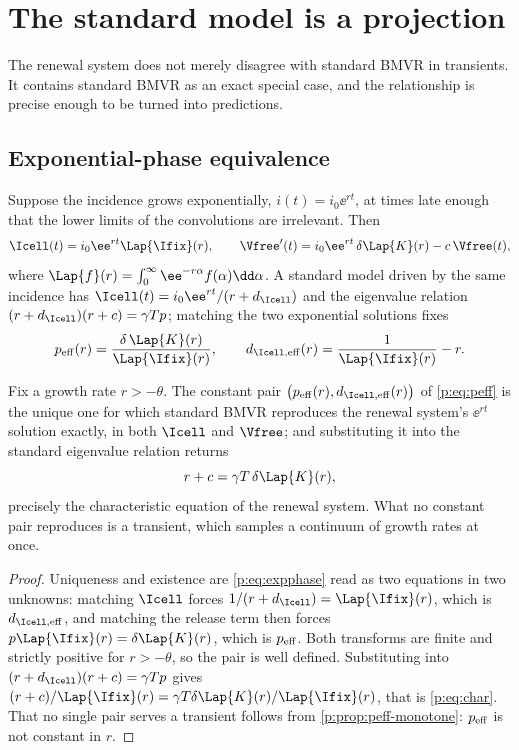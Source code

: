 \FloatBarrier

\section{The standard model is a projection}
\label{p:sec:projection}

The renewal system does not merely disagree with standard BMVR in
transients. It contains standard BMVR as an exact special case, and the
relationship is precise enough to be turned into predictions.

\subsection{Exponential-phase equivalence}

Suppose the incidence grows exponentially, $i(t)=i_0\ee^{rt}$, at times late
enough that the lower limits of the convolutions are irrelevant. Then
\begin{equation}
\Icell(t)=i_0\ee^{rt}\Lap{\Ifix}(r),
\qquad
\Vfree'(t)=i_0\ee^{rt}\,\delta\Lap{K}(r)-c\,\Vfree(t),
\label{p:eq:expphase}
\end{equation}
where $\Lap{f}(r)=\int_0^\infty\ee^{-r\alpha}f(\alpha)\dd\alpha$. A standard
model driven by the same incidence has $\Icell(t)=i_0\ee^{rt}/(r+d_{\Icell})$
and the eigenvalue relation $(r+d_{\Icell})(r+c)=\gamma Tp$; matching the two
exponential solutions fixes
\begin{equation}
p_{\rm eff}(r)=\frac{\delta\,\Lap{K}(r)}{\Lap{\Ifix}(r)},
\qquad
d_{\Icell,{\rm eff}}(r)=\frac{1}{\Lap{\Ifix}(r)}-r.
\label{p:eq:peff}
\end{equation}

\begin{theorem}
\label{p:thm:projection}
Fix a growth rate $r>-\theta$. The constant pair
$\bigl(p_{\rm eff}(r),d_{\Icell,{\rm eff}}(r)\bigr)$ of \cref{p:eq:peff} is
the unique one for which standard BMVR reproduces the renewal system's
$\ee^{rt}$ solution exactly, in both $\Icell$ and $\Vfree$; and substituting
it into the standard eigenvalue relation returns
\begin{equation}
r+c=\gamma T\,\delta\Lap{K}(r),
\label{p:eq:char}
\end{equation}
precisely the characteristic equation of the renewal system. What no
constant pair reproduces is a transient, which samples a continuum of growth
rates at once.
\end{theorem}

\begin{proof}
Uniqueness and existence are \cref{p:eq:expphase} read as two equations in
two unknowns: matching $\Icell$ forces $1/(r+d_{\Icell})=\Lap{\Ifix}(r)$,
which is $d_{\Icell,{\rm eff}}$, and matching the release term then forces
$p\Lap{\Ifix}(r)=\delta\Lap{K}(r)$, which is $p_{\rm eff}$. Both transforms
are finite and strictly positive for $r>-\theta$, so the pair is well
defined. Substituting into $(r+d_{\Icell})(r+c)=\gamma Tp$ gives
$(r+c)/\Lap{\Ifix}(r)=\gamma T\delta\Lap{K}(r)/\Lap{\Ifix}(r)$, that is
\cref{p:eq:char}. That no single pair serves a transient follows from
\cref{p:prop:peff-monotone}: $p_{\rm eff}$ is not constant in $r$.
\end{proof}

